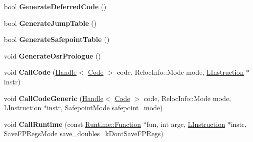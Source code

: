 \begin{DoxyCompactItemize}
\item 
bool {\bfseries Generate\+Deferred\+Code} ()\hypertarget{classv8_1_1internal_1_1_l_code_gen_a7edbe3129e1ff758f4c3d471d6038aee}{}\label{classv8_1_1internal_1_1_l_code_gen_a7edbe3129e1ff758f4c3d471d6038aee}

\item 
bool {\bfseries Generate\+Jump\+Table} ()\hypertarget{classv8_1_1internal_1_1_l_code_gen_af066f353885f2f3cec35f74445989328}{}\label{classv8_1_1internal_1_1_l_code_gen_af066f353885f2f3cec35f74445989328}

\item 
bool {\bfseries Generate\+Safepoint\+Table} ()\hypertarget{classv8_1_1internal_1_1_l_code_gen_aa8cc24b1134b87ea8ce0a9a5c5688b5a}{}\label{classv8_1_1internal_1_1_l_code_gen_aa8cc24b1134b87ea8ce0a9a5c5688b5a}

\item 
void {\bfseries Generate\+Osr\+Prologue} ()\hypertarget{classv8_1_1internal_1_1_l_code_gen_a911d24be4ac4e392d736d9769b7ebb8f}{}\label{classv8_1_1internal_1_1_l_code_gen_a911d24be4ac4e392d736d9769b7ebb8f}

\item 
void {\bfseries Call\+Code} (\hyperlink{classv8_1_1internal_1_1_handle}{Handle}$<$ \hyperlink{classv8_1_1internal_1_1_code}{Code} $>$ code, Reloc\+Info\+::\+Mode mode, \hyperlink{classv8_1_1internal_1_1_l_instruction}{L\+Instruction} $\ast$instr)\hypertarget{classv8_1_1internal_1_1_l_code_gen_aca293066a99024759f94b995c6ba5ce5}{}\label{classv8_1_1internal_1_1_l_code_gen_aca293066a99024759f94b995c6ba5ce5}

\item 
void {\bfseries Call\+Code\+Generic} (\hyperlink{classv8_1_1internal_1_1_handle}{Handle}$<$ \hyperlink{classv8_1_1internal_1_1_code}{Code} $>$ code, Reloc\+Info\+::\+Mode mode, \hyperlink{classv8_1_1internal_1_1_l_instruction}{L\+Instruction} $\ast$instr, Safepoint\+Mode safepoint\+\_\+mode)\hypertarget{classv8_1_1internal_1_1_l_code_gen_a902e149712841134b7a31a866542b477}{}\label{classv8_1_1internal_1_1_l_code_gen_a902e149712841134b7a31a866542b477}

\item 
void {\bfseries Call\+Runtime} (const \hyperlink{structv8_1_1internal_1_1_runtime_1_1_function}{Runtime\+::\+Function} $\ast$fun, int argc, \hyperlink{classv8_1_1internal_1_1_l_instruction}{L\+Instruction} $\ast$instr, Save\+F\+P\+Regs\+Mode save\+\_\+doubles=k\+Dont\+Save\+F\+P\+Regs)\hypertarget{classv8_1_1internal_1_1_l_code_gen_a0667f2d6dadb8c8d199fff87298ae487}{}\label{classv8_1_1internal_1_1_l_code_gen_a0667f2d6dadb8c8d199fff87298ae487}


\end{DoxyCompactItemize}
